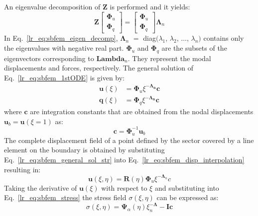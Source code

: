 %
An eigenvalue decomposition of $\mathbf{Z}$ is performed and it yields:
\begin{equation}
    \mathbf{Z} \begin{bmatrix}
        \mathbf{\Phi}_u \\
        \mathbf{\Phi}_q
    \end{bmatrix} = \begin{bmatrix}
        \mathbf{\Phi}_u  \\
        \mathbf{\Phi}_q
    \end{bmatrix} \mathbf{\Lambda}_n
    \label{lr_eq:sbfem_eigen_decomp}
\end{equation}
%
In Eq.~\ref{lr_eq:sbfem_eigen_decomp}, $\mathbf{\Lambda}_n$ $=$ diag$(\lambda_1$, $\lambda_2$, $\dots$, $\lambda_n)$ contains only the eigenvalues with negative real part.
$\mathbf{\Phi}_u$ and $\mathbf{\Phi}_q$ are the subsets of the eigenvectors corresponding to $\mathbf{Lambda}_n$.
They represent the modal displacements and forces, respectively.
The general solution of Eq.~\ref{lr_eq:sbfem_1stODE} is given by:
\begin{align}
    \mathbf{u}(\xi) &= \mathbf{\Phi}_u \xi^{-\mathbf{\Lambda_n}} \mathbf{c}
    \label{lr_eq:sbfem_general_sol_disp} \\
    \mathbf{q}(\xi) &= \mathbf{\Phi}_q \xi^{-\mathbf{\Lambda_n}} \mathbf{c}
    \label{lr_eq:sbfem_general_sol_str}
\end{align}
%
where $\mathbf{c}$ are integration constants that are obtained from the nodal displacements $\mathbf{u}_b = \mathbf{u}(\xi=1)$ as:
\begin{equation}
    \mathbf{c} = \mathbf{\Phi}_u^{-1} \mathbf{u}_b
    \label{lr_eq:sbfem_int_constant}
\end{equation}
%
The complete displacement field of a point defined by the sector covered by a line element on the boundary is obtained by substituting Eq.~\ref{lr_eq:sbfem_general_sol_str} into Eq.~\ref{lr_eq:sbfem_disp_interpolation} resulting in:
\begin{equation}
    \mathbf{u}(\xi,\eta) = \mathbf{R}(\eta) \mathbf{\Phi}_u \xi ^{-\mathbf{\Lambda}_n} c
    \label{lr_eq:sbfem_displacement_field}
\end{equation}
%
Taking the derivative of $\mathbf{u}(\xi)$ with respect to $\xi$ and substituting into Eq.~\ref{lr_eq:sbfem_stress} the stress field $\sigma(\xi,\eta)$ can be expressed as:
\begin{equation}
    \sigma(\xi,\eta) = \mathbf{\Psi}_\alpha (\eta) \xi^{-\mathbf\Lambda}_n - \mathbf{I} \mathbf{c}
    \label{lr_eq:sbfem_stress_field}
\end{equation}

